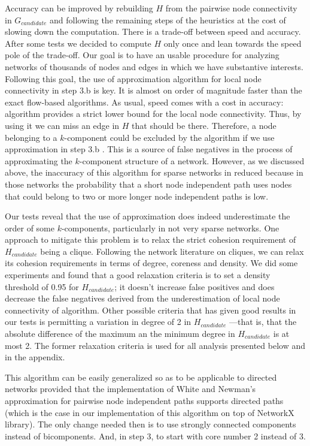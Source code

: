 Accuracy can be improved by rebuilding $H$ from the pairwise node connectivity in $G_{candidate}$ and following the remaining steps of the heuristics at the cost of slowing down the computation. There is a trade-off between speed and accuracy. After some tests we decided to compute $H$ only once and lean towards the speed pole of the trade-off. Our goal is to have an usable procedure for analyzing networks of thousands of nodes and edges in which we have substantive interests. Following this goal, the use of \citet{white:2001b} approximation algorithm for local node connectivity in step 3.b is key. It is almost on order of magnitude faster than the exact flow-based algorithms. As usual, speed comes with a cost in accuracy: \citet{white:2001b} algorithm provides a strict lower bound for the local node connectivity. Thus, by using it we can miss an edge in $H$ that should be there. Therefore, a node belonging to a $k$-component could be excluded by the algorithm if we use \citet{white:2001b} approximation in step 3.b . This is a source of false negatives in the process of approximating the $k$-component structure of a network. However, as we discussed above, the inaccuracy of this algorithm for sparse networks in reduced because in those networks the probability that a short node independent path uses nodes that could belong to two or more longer node independent paths is low.

Our tests reveal that the use of \citet{white:2001b} approximation does indeed underestimate the order of some $k$-components, particularly in not very sparse networks. One approach to mitigate this problem is to relax the strict cohesion requirement of $H_{candidate}$ being a clique. Following the network literature on cliques, we can relax its cohesion requirements in terms of degree, coreness and density. We did some experiments and found that a good relaxation criteria is to set a density threshold of 0.95 for $H_{candidate}$; it doesn't increase false positives and does decrease the false negatives derived from the underestimation of local node connectivity of \citet{white:2001b} algorithm.  Other possible criteria that has given good results in our tests is permitting a variation in degree of 2 in $H_{candidate}$ ---that is, that the absolute difference of the maximum an the minimum degree in $H_{candidate}$ is at most 2. The former relaxation criteria is used for all analysis presented below and in the appendix.

This algorithm can be easily generalized so as to be applicable to directed networks provided that the implementation of White and Newman's approximation for pairwise node independent paths supports directed paths (which is the case in our implementation of this algorithm on top of NetworkX library). The only change needed then is to use strongly connected components instead of bicomponents. And, in step 3, to start with core number 2 instead of 3.

